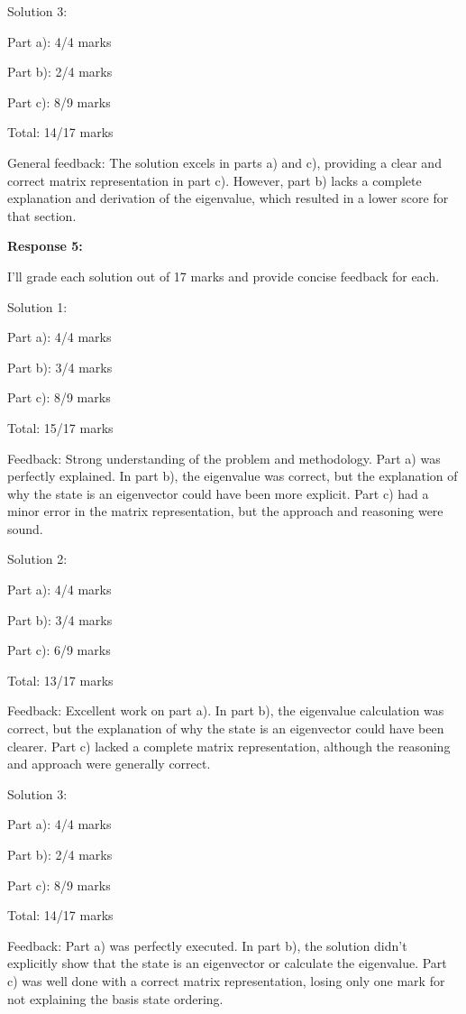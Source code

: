 \documentclass[a4paper,11pt]{article}
\begin{document}
Solution 3:

Part a): 4/4 marks

Part b): 2/4 marks

Part c): 8/9 marks

Total: 14/17 marks

General feedback: The solution excels in parts a) and c), providing a clear and correct matrix representation in part c). However, part b) lacks a complete explanation and derivation of the eigenvalue, which resulted in a lower score for that section.

\bigskip
\textbf{Response 5:}

I'll grade each solution out of 17 marks and provide concise feedback for each.

Solution 1:

Part a): 4/4 marks

Part b): 3/4 marks

Part c): 8/9 marks

Total: 15/17 marks

Feedback: Strong understanding of the problem and methodology. Part a) was perfectly explained. In part b), the eigenvalue was correct, but the explanation of why the state is an eigenvector could have been more explicit. Part c) had a minor error in the matrix representation, but the approach and reasoning were sound.

Solution 2:

Part a): 4/4 marks

Part b): 3/4 marks

Part c): 6/9 marks

Total: 13/17 marks

Feedback: Excellent work on part a). In part b), the eigenvalue calculation was correct, but the explanation of why the state is an eigenvector could have been clearer. Part c) lacked a complete matrix representation, although the reasoning and approach were generally correct.

Solution 3:

Part a): 4/4 marks

Part b): 2/4 marks

Part c): 8/9 marks

Total: 14/17 marks

Feedback: Part a) was perfectly executed. In part b), the solution didn't explicitly show that the state is an eigenvector or calculate the eigenvalue. Part c) was well done with a correct matrix representation, losing only one mark for not explaining the basis state ordering.
\end{document}
